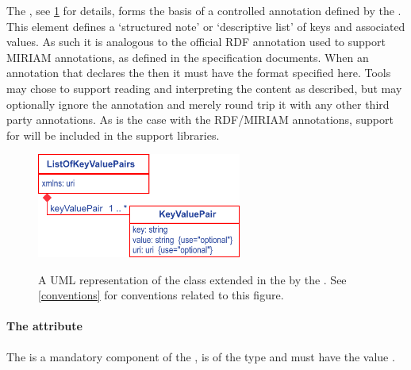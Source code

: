 The \ListOfKeyValuePairs, see \ref{fig:fbc_v3_uml_keyvalue} for details, forms the basis of a controlled annotation defined by the \FBCPackage. This element defines a `structured note' or `descriptive list' of keys and associated values.
%
%
As such it is analogous to the official \SBML RDF annotation used to support MIRIAM annotations, as defined in the \SBML specification documents. When an annotation that declares the   then it must have the format specified here. Tools may chose to support reading and interpreting the content as described, but may optionally ignore the annotation and merely round trip it with any other third party annotations. As is the case with the RDF/MIRIAM annotations, support for \ListOfKeyValuePairs will be included in the \SBML support libraries.
%
\begin{figure}[ht]
  \centering
  \includegraphics[width=0.6\textwidth]{images/fbc_v3_uml_keyvalue.pdf}\\
  \caption{A UML representation of the \SBML \SBase class extended in
  the \FBCPackage by the \protect{\ListOfKeyValuePairs}. See \ref{conventions} for conventions related to this figure.}
  \label{fig:fbc_v3_uml_keyvalue}
\end{figure}
%

\paragraph{The  attribute}
The  is a mandatory component of the \ListOfKeyValuePairs, is of the type  and must have the value .


